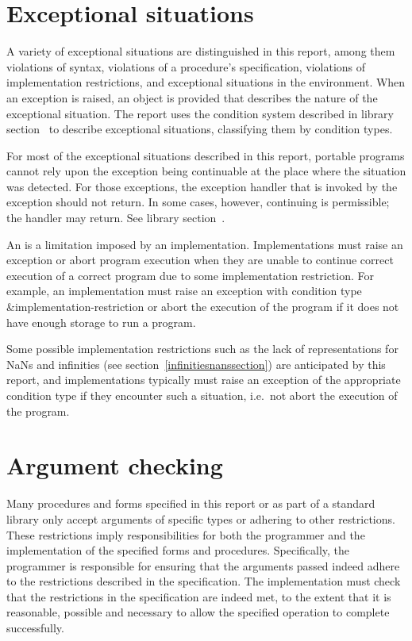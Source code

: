 \section{Exceptional situations}
\label{exceptionalsituationsection}

A variety of exceptional situations
are distinguished in this report, among them violations of 
syntax, violations of a procedure's specification, violations of
implementation restrictions, and exceptional situations in the
environment.  When an exception is raised, an object is provided that
describes the nature of the exceptional situation.  The report uses
the condition system described in library section~ to
describe exceptional situations, classifying them by condition types.

For most of the exceptional situations described in this report,
portable programs cannot rely upon the exception being continuable
at the place where the situation was detected.
For those exceptions, the exception handler that is invoked by the
exception should not return.
In some cases, however, continuing is permissible; the
handler may return.  See library section~.

An  is a limitation imposed by an
implementation.  Implementations must raise an exception or abort
program execution when they are unable to continue correct execution
of a correct program due to some implementation restriction.  For
example, an implementation must raise an exception with condition type
{\cf\&implementation-restriction} or abort the execution of the
program if it does not have enough storage to run a program.

Some possible implementation restrictions such as the lack of
representations for NaNs and infinities (see
section~\ref{infinitiesnanssection}) are anticipated by this report,
and implementations typically must raise an exception of the
appropriate condition type if they encounter such a situation, i.e.\
not abort the execution of the program.

\section{Argument checking}
\label{argumentcheckingsection}

Many procedures and forms specified in this report or as part of a
standard library only accept arguments of specific types or adhering
to other restrictions.  These restrictions imply responsibilities for
both the programmer and the implementation of the specified forms and
procedures.  Specifically, the programmer is responsible for ensuring
that the arguments passed indeed adhere to the restrictions described
in the specification.  The implementation must check
that the restrictions in the specification are indeed met, to the
extent that it is reasonable, possible and necessary to allow the
specified operation to complete successfully.

